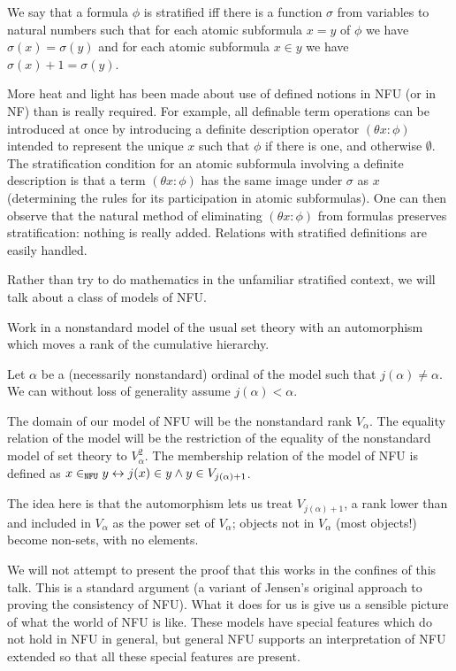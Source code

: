 \documentclass{slides}
\begin{document}
\begin{slide}

We say that a formula $\phi$ is stratified iff there is a function $\sigma$ from variables to natural numbers such that
for each atomic subformula $x=y$ of $\phi$ we have $\sigma(x)=\sigma(y)$ and for each atomic subformula $x \in y$ we have $\sigma(x)+1= \sigma(y)$.

More heat and light has been made about use of defined notions in NFU (or in NF) than is really required.  For example, all definable term operations can be introduced at once by introducing a definite description operator
$(\theta x:\phi)$ intended to represent the unique $x$ such that $\phi$ if there is one, and otherwise $\emptyset$.
The stratification condition for an atomic subformula involving a definite description is that a term $(\theta x:\phi)$ has the same image under $\sigma$ as $x$ (determining the rules for its participation in atomic subformulas).  One can then observe that the natural method of eliminating $(\theta x:\phi)$ from formulas preserves stratification:  nothing is really added.  Relations with stratified definitions are easily handled.

\end{slide}

\begin{slide}

Rather than try to do mathematics in the unfamiliar stratified context, we will talk about a class of models of NFU.

Work in a nonstandard model of the usual set theory with an automorphism which moves a rank of the cumulative hierarchy.

Let $\alpha$ be a (necessarily nonstandard) ordinal of the model such that $j(\alpha) \neq \alpha$.  We can without loss of generality assume $j(\alpha)<\alpha$.

The domain of our model of NFU will be the nonstandard rank $V_\alpha$.  The equality relation of the model will be the restriction of the equality of the nonstandard model of set theory to $V_\alpha^2$.  The membership relation of the model of NFU is defined as $x \in_{\tt NFU} y \leftrightarrow j(x) \in y \wedge y \in V_{j(\alpha)+1}$.

\end{slide}


\begin{slide}

The idea here is that the automorphism lets us treat $V_{j(\alpha)+1}$, a rank lower than and included in $V_\alpha$
as the power set of $V_\alpha$;  objects not in $V_\alpha$ (most objects!) become non-sets, with no elements.

We will not attempt to present the proof that this works in the confines of this talk.  This is a standard argument (a variant of Jensen's original approach to proving the consistency of NFU).  What it does for us is give us a sensible picture of what the world of NFU is like.  These models have special features which do not hold in NFU in general, but general NFU supports an interpretation of NFU extended so that  all these special features are present.

\end{slide}
\end{document}
